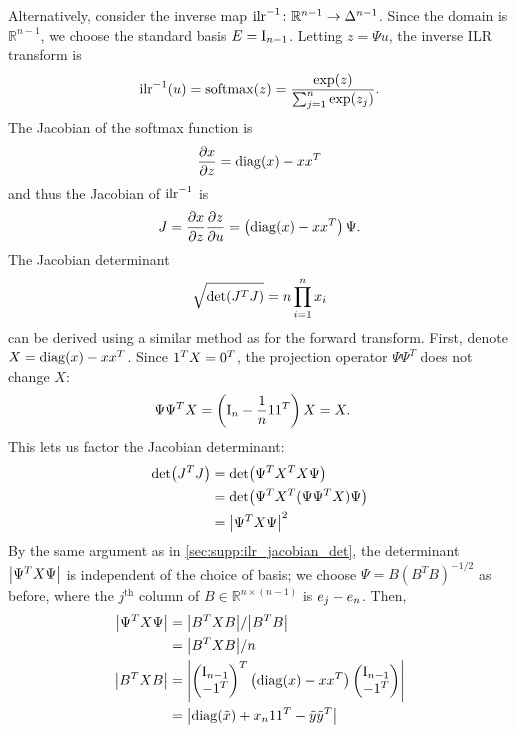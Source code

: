Alternatively, consider the inverse map $\operatorname{ilr}^{-1} \colon \mathbb{R}^{n-1}\to \Delta^{n-1}$.
Since the domain is $\mathbb{R}^{n-1}$, we choose the standard basis $E = \mathrm{I}_{n-1}$.
Letting $z = \Psi u$, the inverse \gls*{ILR} transform is
\begin{align}
    \InvILR{u} = \operatorname{softmax}(z) = \frac{\exp(z)}{\sum_{j=1}^{n}\exp(z_j)}.
\end{align}
The Jacobian of the softmax function is
\begin{align}
    \frac{\partial x}{\partial z} = \Diag{x} - xx^T
\end{align}
and thus the Jacobian of $\operatorname{ilr}^{-1}$ is
\begin{align}
    J = \frac{\partial x}{\partial z} \frac{\partial z}{\partial u} = \left(\Diag{x}-xx^T\right)\Psi.
\end{align}
The Jacobian determinant
\begin{align}
    \sqrt{\Det{J^T J}} = n\prod_{i=1}^{n} x_i
\end{align}
can be derived using a similar method as for the forward transform.
First, denote $X = \Diag{x} - xx^T$.
Since $\mathrm{1}^T X = \mathrm{0}^T$, the projection operator $\Psi \Psi^T$ does not change $X$:
\begin{align*}
    \Psi \Psi^T X & = \left( \mathrm{I}_{n} - \frac{1}{n} \mathrm{1} \mathrm{1}^T \right) X = X.
\end{align*}
This lets us factor the Jacobian determinant:
\begin{align*}
    \Det{J^T J} & = \Det{\Psi^T X^T X \Psi}               \\
                & = \Det{\Psi^T X^T (\Psi \Psi^T X) \Psi} \\
                & = \AbsDet{\Psi^T X \Psi}^2
\end{align*}
By the same argument as in \cref{sec:supp:ilr_jacobian_det}, the determinant $\left\lvert\Psi^T X \Psi\right\rvert$ is independent of the choice of basis;
we choose $\Psi = B(B^T B)^{-1/2}$ as before, where the $j^\text{th}$ column of $B \in \mathbb{R}^{n \times (n-1)}$ is $e_j - e_n$.
Then,
\begin{align*}
    \AbsDet{\Psi^T X \Psi} & = \AbsDet{B^T X B} / \AbsDet{B^T B}                                                               \\
                           & = \AbsDet{B^T X B} / n                                                                            \\
    \AbsDet{B^T X B}       & = \AbsDet{\begin{pmatrix} \Id_{n-1} \\ -\One^T \end{pmatrix}^T \left( \Diag{x} - xx^T \right) \begin{pmatrix} \Id_{n-1} \\ -\One^T \end{pmatrix}} \\
                           & = \AbsDet{\Diag{\tilde{x}} + x_n \One \One^T - \tilde{y} \tilde{y}^T}
\end{align*}
